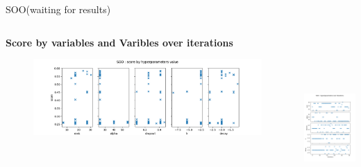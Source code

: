 \begin{frame}[allowframebreaks]{SOO(waiting for results)}
\begin{columns}
        \begin{column}{0.65\textwidth}
            \textbf{Score by variables and Varibles over iterations}
                \begin{figure}[h]
                    \includegraphics[width = \textwidth]{imgs/plots/exp10_score_by_hp.png}
                \end{figure}     
        \end{column}

        \begin{column}{0.4\textwidth}
            \includegraphics[height = 7cm]{imgs/plots/exp10_variables_over_time.png}
            
            
        \end{column}
    \end{columns}  
\end{frame}

